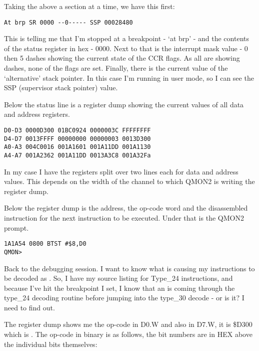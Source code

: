 \begin{appendix}
Taking the above a section at a time, we have this first:

\begin{lstlisting}[frame=none,numbers=none,]
At brp SR 0000 --0----- SSP 00028480
\end{lstlisting}

This is telling me that I'm stopped at a breakpoint -{} `at brp' -{} and the
contents of the status register in hex -{} 0000. Next to that is the interrupt
mask value -{} 0 then 5 dashes showing the current state of the CCR flags. As all
are showing dashes, none of the flags are set. Finally, there is the current
value of the `alternative' stack pointer. In this case I'm running in user mode,
so I can see the SSP (supervisor stack pointer) value. 

Below the status line is a register dump showing the current values of all data
and address registers.

\begin{lstlisting}[frame=none,numbers=none,]
D0-D3 0000D300 01BC0924 0000003C FFFFFFFF
D4-D7 0013FFFF 00000000 00000003 0013D300
A0-A3 004C0016 001A1601 001A11DD 001A1130
A4-A7 001A2362 001A11DD 0013A3C8 001A32Fa
\end{lstlisting}

In my case I have the registers split over two lines each for data and address
values. This depends on the width of the channel to which QMON2 is writing the
register dump.

Below the register dump is the address, the op-{}code word and the disassembled
instruction for the next instruction to be executed. Under that is the QMON2
prompt.

\begin{lstlisting}[frame=none,numbers=none,]
1A1A54 0800 BTST #$8,D0
QMON>
\end{lstlisting}

Back to the debugging session. I want to know what is causing my 
instructions to be decoded as . So, I have my source listing for Type\_24
instructions, and because I've hit the breakpoint I set, I know that an  is
coming through the type\_24 decoding routine before jumping into the type\_30
decode -{} or is it? I need to find out.

The register dump shows me the op-{}code in D0.W and also in D7.W, it is \$D300
which is . The op-{}code in binary is as follows, the bit numbers are in
HEX above the individual bits themselves:


\end{appendix}
